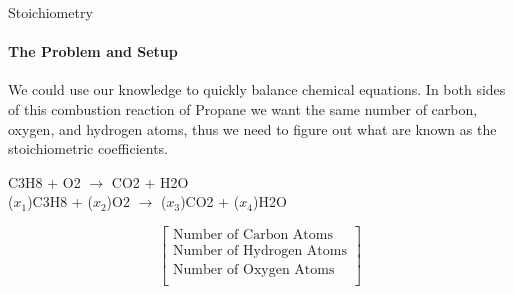 \documentclass{beamer}
\begin{document}
\begin{frame}{Stoichiometry}
\framesubtitle{The Problem and Setup}
We could use our knowledge to quickly balance chemical equations. In both sides of this combustion reaction of Propane we want the same number of carbon, oxygen, and hydrogen atoms, thus we need to figure out what are known as the stoichiometric coefficients.

{\tiny 
\begin{center}
    C3H8 + O2 $\xrightarrow{}$ CO2 + H2O  \\
    ($x_1$)C3H8 + ($x_2$)O2 $\xrightarrow{}$ ($x_3$)CO2 + ($x_4$)H2O
\end{center}

\[
\begin{bmatrix}
    \text{Number of Carbon Atoms} \\
    \text{Number of Hydrogen Atoms} \\
    \text{Number of Oxygen Atoms} \\
\end{bmatrix}
\]

}
\end{frame}
\end{document}

